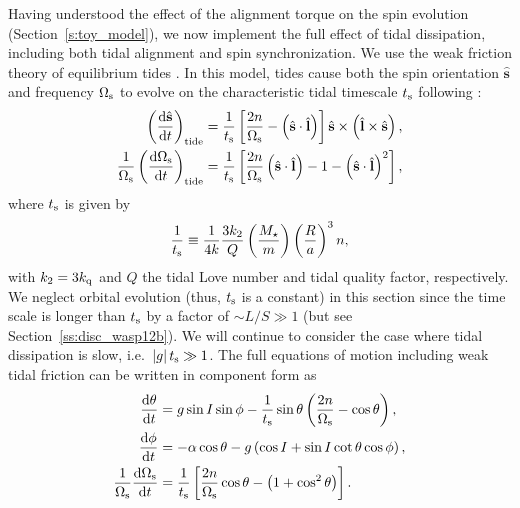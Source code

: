 \documentclass[
        fleqn,
        usenatbib,
        referee
    ]{mnras}
\newcommand*{\rd}[2]{\frac{\mathrm{d}#1}{\mathrm{d}#2}}
\newcommand*{\abs}[1]{\left|#1\right|}
\newcommand*{\p}[1]{\left(#1\right)}
\newcommand*{\s}[1]{\left[#1\right]}
\newcommand*{\uv}[1]{\hat{\boldsymbol{\mathbf{#1}}}}
\begin{document}
Having understood the effect of the alignment torque on the spin evolution
(Section~\ref{s:toy_model}), we now implement the full effect of tidal
dissipation, including both tidal alignment and spin synchronization. We use the
weak friction theory of equilibrium tides \citep[e.g.][]{alexander1973weak,
hut1981tidal}. In this model, tides cause both the spin orientation $\uv{s}$ and
frequency $\Omega_{\rm s}$ to evolve on the characteristic tidal timescale
$t_{\rm s}$ following \citep[see][]{lai2012}:
\begin{align}
    \p{\rd{\uv{s}}{t}}_{\rm tide} &= \frac{1}{t_{\rm s}}
                \s{\frac{2n}{\Omega_{\rm s}} - \p{\uv{s} \cdot \uv{l}}}
                    \uv{s} \times \p{\uv{l} \times \uv{s}}\label{eq:dsdt_tide},\\
    \frac{1}{\Omega_{\rm s}}\p{\rd{\Omega_{\rm s}}{t}}_{\rm tide}
        &= \frac{1}{t_{\rm s}} \s{\frac{2n}{\Omega_{\rm s}}\p{\uv{s} \cdot
            \uv{l}} - 1 - \p{\uv{s} \cdot \uv{l}}^2},\label{eq:dWsdt_tide}
\end{align}
where $t_{\rm s}$ is given by
\begin{equation}
    \frac{1}{t_{\rm s}} \equiv \frac{1}{4k}
        \frac{3k_2}{Q}\p{\frac{M_\star}{m}}\p{\frac{R}{a}}^3 n,
\end{equation}
with $k_2 = 3k_{\rm q}$ and $Q$ the tidal Love number and tidal quality factor,
respectively. We neglect orbital evolution (thus, $t_{\rm s}$ is a constant) in
this section since the time scale is longer than $t_{\rm s}$ by a factor of
$\sim L / S \gg 1$ (but see Section~\ref{ss:disc_wasp12b}). We will continue
to consider the case where tidal dissipation is slow, i.e.\ $\abs{g}t_{\rm
s} \gg 1$. The full equations of motion including weak tidal friction can be
written in component form as
\begin{align}
    \rd{\theta}{t} &= g\sin I \sin \phi -
        \frac{1}{t_{\rm s}}\sin \theta\p{\frac{2n}{\Omega_{\rm s}} - \cos \theta}
            ,\label{eq:ds_fullq}\\
    \rd{\phi}{t} &= -\alpha\cos\theta
        - g\p{\cos I + \sin I \cot \theta \cos \phi}\label{eq:ds_fullphi},\\
    \frac{1}{\Omega_{\rm s}}\rd{\Omega_{\rm s}}{t}
        &= \frac{1}{t_{\rm s}} \s{\frac{2n}{\Omega_{\rm s}} \cos \theta
            - \p{1 + \cos^2\theta}}\label{eq:ds_fulls}.
\end{align}
\end{document}
